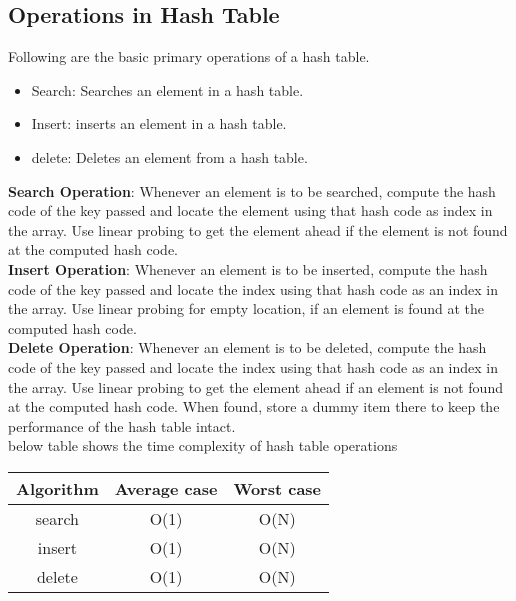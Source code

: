 \documentclass[journal,12pt,twocolumn]{IEEEtran}
\begin{document}
\subsection{\textbf{Operations in Hash Table}}
Following are the basic primary operations of a hash table.\\
\begin{itemize}
\item Search: Searches an element in a hash table.
\item Insert: inserts an element in a hash table.
\item delete: Deletes an element from a hash table.
\end{itemize}
\textbf{Search Operation}:
Whenever an element is to be searched, compute the hash code of the key passed and locate the element using that hash code as index in the array. Use linear probing to get the element ahead if the element is not found at the computed hash code.
\\
\textbf{Insert Operation}:
Whenever an element is to be inserted, compute the hash code of the key passed and locate the index using that hash code as an index in the array. Use linear probing for empty location, if an element is found at the computed hash code.\\
\textbf{Delete Operation}:
Whenever an element is to be deleted, compute the hash code of the key passed and locate the index using that hash code as an index in the array. Use linear probing to get the element ahead if an element is not found at the computed hash code. When found, store a dummy item there to keep the performance of the hash table intact.\\
below table shows the time complexity of hash table operations 
\begin{center}
\begin{tabular}{ |c|c|c| } 
 \hline
Algorithm  & Average case& Worst case \\
\hline
search  &O(1) & O(N) \\
insert  & O(1) & O(N) \\
delete  & O(1) & O(N) \\
 \hline
\end{tabular}
\end{center}
\end{document}

